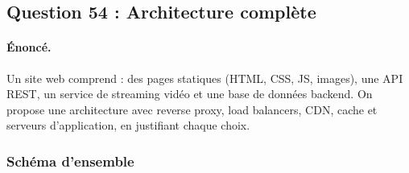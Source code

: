 \documentclass[12pt,a4paper]{article}
\begin{document}
\subsection*{Question 54  : Architecture compl\`ete}

\paragraph{\'Enonc\'e.} Un site web comprend : des pages statiques (HTML, CSS, JS, images), une API REST, un service de streaming vid\'eo et une base de donn\'ees backend. On propose une architecture avec reverse proxy, load balancers, CDN, cache et serveurs d'application, en justifiant chaque choix.

\subsubsection*{Sch\'ema d'ensemble}
\end{document}
